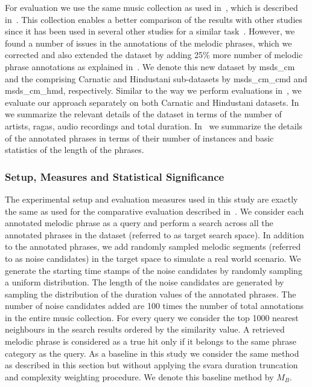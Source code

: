 For evaluation we use the same music collection as used in~, which is described in~. This collection enables a better comparison of the results with other studies since it has been used in several other studies for a similar task~\citep{Rao2014,Ross2012b}. However, we found a number of issues in the annotations of the melodic phrases, which we corrected and also extended the dataset by adding 25\% more number of melodic phrase annotations as explained in~. We denote this new dataset by \acrshort{msds_cm} and the comprising Carnatic and Hindustani sub-datasets by \acrshort{msds_cm_cmd} and \acrshort{msds_cm_hmd}, respectively. Similar to the way we perform evaluations in~, we evaluate our approach separately on both Carnatic and Hindustani datasets. In~ we summarize the relevant details of the dataset in terms of the number of artists, \glspl{raga}, audio recordings and total duration. In~ we summarize the details of the annotated phrases in terms of their number of instances and basic statistics of the length of the phrases.


\subsubsection{Setup, Measures and Statistical Significance}
\label{sec:patterns_improving_similarity_experimental_setup}

The experimental setup and evaluation measures used in this study are exactly the same as used for the comparative evaluation described in~. We consider each annotated melodic phrase as a query and perform a search across all the annotated phrases in the dataset (referred to as target search space). In addition to the annotated phrases, we add randomly sampled melodic segments (referred to as noise candidates) in the target space to simulate a real world scenario. We generate the starting time stamps of the noise candidates by randomly sampling a uniform distribution. The length of the noise candidates are generated by sampling the distribution of the duration values of the annotated phrases. The number of noise candidates added are 100 times the number of total annotations in the entire music collection. For every query we consider the top 1000 nearest neighbours in the search results ordered by the similarity value. A retrieved melodic phrase is considered as a true hit only if it belongs to the same phrase category as the query. As a baseline in this study we consider the same method as described in this section but without applying the \gls{svara} duration truncation and complexity weighting procedure. We denote this baseline method by $M_{B}$.

